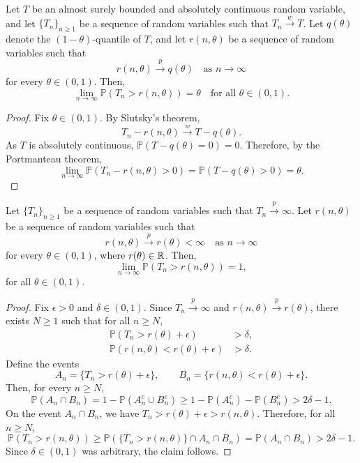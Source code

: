 \begin{lemma}\label{lemma:general_asympt_level}
Let $T$ be an almost surely bounded and absolutely continuous random variable, and let $\{T_n\}_{n\geq 1}$ be a sequence of random variables such that $T_n \overset{w}{\to} T$. Let $q(\theta)$ denote the $(1-\theta)$-quantile of $T$, and let $r(n,\theta)$ be a sequence of random variables such that
\[
r(n,\theta) \overset{p}{\to} q(\theta)
\quad \text{as } n \to \infty
\]
for every $\theta \in (0,1)$. Then,
\[
\lim_{n \to \infty} \mathbb{P}\!\left(T_n > r(n,\theta)\right) = \theta
\quad \text{for all } \theta \in (0,1).
\]
\end{lemma}
\begin{proof}
Fix $\theta \in (0,1)$. By Slutsky’s theorem,
\[
T_n - r(n,\theta) \overset{w}{\to}T-q(\theta).
\]
As $T$ is absolutely continuous, $\mathbb{P}(T - q(\theta) = 0) = 0$. Therefore, by the Portmanteau theorem,
\[
\lim_{n \to \infty}\mathbb{P}(T_n - r(n,\theta) > 0) 
= \mathbb{P}(T - q(\theta) > 0) = \theta.
\]
\end{proof}




\begin{lemma}\label{lemma:general_consist}
Let $\{T_n\}_{n\geq 1}$ be a sequence of random variables such that $T_n \overset{p}{\to} \infty$. Let $r(n,\theta)$ be a sequence of random variables such that
\[
r(n,\theta) \overset{p}{\to} r(\theta) < \infty
\quad \text{as } n \to \infty
\]
for every $\theta \in (0,1)$, where $r(\theta) \in \mathbb{R}$. Then,
\[
\lim_{n \to \infty} \mathbb{P}\!\left(T_n > r(n,\theta)\right) = 1,
\]
for all $\theta \in (0,1)$.
\end{lemma}
\begin{proof}
Fix $\epsilon > 0$ and $\delta \in (0,1)$. Since $T_n \overset{p}{\to} \infty$ and $r(n,\theta) \overset{p}{\to} r(\theta)$, there exists $N \geq 1$ such that for all $n \geq N$,
\begin{align*}
\mathbb{P}\!\left(T_n > r(\theta) + \epsilon\right) &> \delta, \\
\mathbb{P}\!\left(r(n,\theta) < r(\theta) + \epsilon\right) &> \delta.
\end{align*}
Define the events
\[
A_n = \{T_n > r(\theta) + \epsilon\},
\qquad
B_n = \{r(n,\theta) < r(\theta) + \epsilon\}.
\]
Then, for every $n \geq N$,
\[
\mathbb{P}(A_n \cap B_n)
= 1 - \mathbb{P}(A_n^c \cup B_n^c)
\geq 1 - \mathbb{P}(A_n^c) - \mathbb{P}(B_n^c)
> 2\delta - 1.
\]
On the event $A_n \cap B_n$, we have $T_n > r(\theta) + \epsilon > r(n,\theta)$. Therefore, for all $n \geq N$,
\[
\mathbb{P}\!\left(T_n > r(n,\theta)\right)
\geq \mathbb{P}\!\left(\{T_n > r(n,\theta)\} \cap A_n \cap B_n\right)
= \mathbb{P}(A_n \cap B_n)
> 2\delta - 1.
\]
Since $\delta \in (0,1)$ was arbitrary, the claim follows.
\end{proof}


